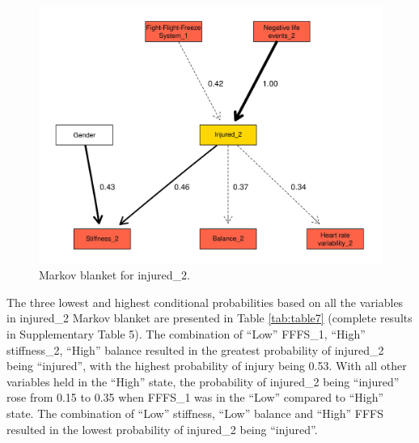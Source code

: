 \documentclass[
  english,
  man]{apa6}
\begin{document}
\begin{figure}

{\centering \includegraphics[width=1\linewidth]{figures_doc/Fig3} 

}

\caption{Markov blanket for injured\_2.}\label{fig:fig3}
\end{figure}

The three lowest and highest conditional probabilities based on all the variables in injured\_2 Markov blanket are presented in Table \ref{tab:table7} (complete results in Supplementary Table 5).
The combination of ``Low'' FFFS\_1, ``High'' stiffness\_2, ``High'' balance resulted in the greatest probability of injured\_2 being ``injured'', with the highest probability of injury being 0.53.
With all other variables held in the ``High'' state, the probability of injured\_2 being ``injured'' rose from 0.15 to 0.35 when FFFS\_1 was in the ``Low'' compared to ``High'' state.
The combination of ``Low'' stiffness, ``Low'' balance and ``High'' FFFS resulted in the lowest probability of injured\_2 being ``injured''.
\end{document}

